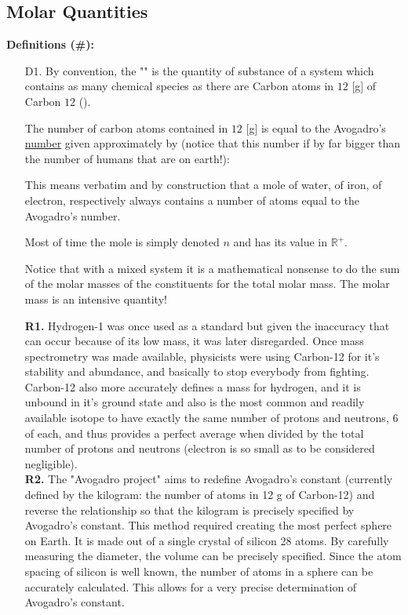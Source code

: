	\subsection{Molar Quantities}
	\textbf{Definitions (\#\mydef):}
	\begin{enumerate}
		\item[D1.] By convention, the "" is the quantity of substance of a system which contains as many chemical species as there are Carbon atoms in $12$ [g] of Carbon $12$ ().
		
		The number of carbon atoms contained in $12$ [g] is equal to the Avogadro's \underline{number} given approximately by (notice that this number if by far bigger than the number of humans that are on earth!):
		
		This means verbatim and by construction that a mole of water, of iron, of electron, respectively always contains a number of atoms equal to the Avogadro's number.
		
		Most of time the mole is simply denoted $n$ and has its value in $\mathbb{R}^{+}$.
		
		Notice that with a mixed system it is a mathematical nonsense to do the sum of the molar masses of the constituents for the total molar mass. The molar mass is an intensive quantity!
		\begin{tcolorbox}[title=Remark,colframe=black,arc=10pt]
		\textbf{R1.} Hydrogen-1 was once used as a standard but given the inaccuracy that can occur because of its low mass, it was later disregarded. Once mass spectrometry was made available, physicists were using Carbon-12 for it's stability and abundance, and basically to stop everybody from fighting. Carbon-12 also more accurately defines a mass for hydrogen, and it is unbound in it's ground state and also is the most common and readily available isotope to have exactly the same number of protons and neutrons, 6 of each, and thus provides a perfect average when divided by the total number of protons and neutrons (electron is so small as to be considered negligible). \\
		
		\textbf{R2.} The "Avogadro project" aims to redefine Avogadro's constant (currently defined by the kilogram: the number of atoms in 12 g of Carbon-12) and reverse the relationship so that the kilogram is precisely specified by Avogadro's constant. This method required creating the most perfect sphere on Earth. It is made out of a single crystal of silicon 28 atoms. By carefully measuring the diameter, the volume can be precisely specified. Since the atom spacing of silicon is well known, the number of atoms in a sphere can be accurately calculated. This allows for a very precise determination of Avogadro's constant.
		\end{tcolorbox}	
		

\end{enumerate}
